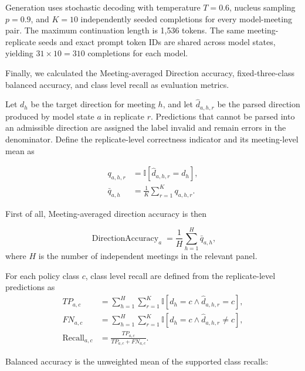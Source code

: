 Generation uses stochastic decoding with temperature \(T=0.6\), nucleus sampling \(p=0.9\), and \(K=10\) independently seeded completions for every model-meeting pair. The maximum continuation length is 1,536 tokens. The same meeting-replicate seeds and exact prompt token IDs are shared across model states, yielding $31 \times 10  = 310$ completions for each model. 


Finally, we calculated the Meeting-averaged Direction accuracy, fixed-three-class balanced accuracy, and class level recall as evaluation metrics. 


Let \(d_h\) be the target direction for meeting \(h\), and let
\(\hat d_{a,h,r}\) be the parsed direction produced by model state \(a\) in replicate \(r\). Predictions that cannot be parsed into an admissible direction are assigned the label \(\mathrm{invalid}\) and remain errors in the denominator. Define the replicate-level correctness indicator and its meeting-level mean as

\begin{align}
    q_{a,h,r}
    &=
    \mathbb{I}\!\left[\hat d_{a,h,r}=d_h\right],
    \\
    \bar q_{a,h}
    &=
    \frac{1}{K}\sum_{r=1}^{K}q_{a,h,r}.
    \label{eq:ch2:decision_true_direction_probability}
\end{align}


First of all, Meeting-averaged direction accuracy is then

\begin{equation}
    \operatorname{DirectionAccuracy}_{a}
    =
    \frac{1}{H}\sum_{h=1}^{H}\bar q_{a,h},
    \label{eq:ch2:decision_direction_accuracy}
\end{equation}
where \(H\) is the number of independent meetings in the relevant panel.


For each policy class \(c\), class level recall are defined from the replicate-level predictions as
\begin{align}
    TP_{a,c}
    &=
    \sum_{h=1}^{H}\sum_{r=1}^{K}
    \mathbb{I}
    [d_h=c \land \hat d_{a,h,r}=c],
    \\
    FN_{a,c}
    &=
    \sum_{h=1}^{H}\sum_{r=1}^{K}
    \mathbb{I}
    [d_h=c \land \hat d_{a,h,r}\neq c],
    \\
    \operatorname{Recall}_{a,c}
    &=
    \frac{TP_{a,c}}{TP_{a,c}+FN_{a,c}}.
\end{align}

Balanced accuracy is the unweighted mean of the supported class recalls:

